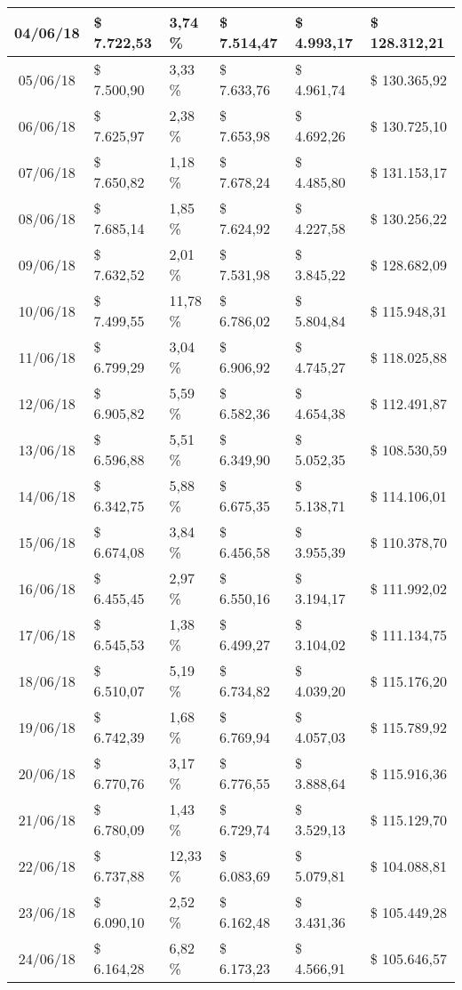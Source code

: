 \begin{small}
\begin{longtable}{|c|l|l|l|l|l|}
04/06/18 & \$ 7.722,53 & 3,74 \% & \$ 7.514,47 & \$ 4.993,17 & \$ 128.312,21 \\ \hline
05/06/18 & \$ 7.500,90 & 3,33 \% & \$ 7.633,76 & \$ 4.961,74 & \$ 130.365,92 \\ \hline
06/06/18 & \$ 7.625,97 & 2,38 \% & \$ 7.653,98 & \$ 4.692,26 & \$ 130.725,10 \\ \hline
07/06/18 & \$ 7.650,82 & 1,18 \% & \$ 7.678,24 & \$ 4.485,80 & \$ 131.153,17 \\ \hline
08/06/18 & \$ 7.685,14 & 1,85 \% & \$ 7.624,92 & \$ 4.227,58 & \$ 130.256,22 \\ \hline
09/06/18 & \$ 7.632,52 & 2,01 \% & \$ 7.531,98 & \$ 3.845,22 & \$ 128.682,09 \\ \hline
10/06/18 & \$ 7.499,55 & 11,78 \% & \$ 6.786,02 & \$ 5.804,84 & \$ 115.948,31 \\ \hline
11/06/18 & \$ 6.799,29 & 3,04 \% & \$ 6.906,92 & \$ 4.745,27 & \$ 118.025,88 \\ \hline
12/06/18 & \$ 6.905,82 & 5,59 \% & \$ 6.582,36 & \$ 4.654,38 & \$ 112.491,87 \\ \hline
13/06/18 & \$ 6.596,88 & 5,51 \% & \$ 6.349,90 & \$ 5.052,35 & \$ 108.530,59 \\ \hline
14/06/18 & \$ 6.342,75 & 5,88 \% & \$ 6.675,35 & \$ 5.138,71 & \$ 114.106,01 \\ \hline
15/06/18 & \$ 6.674,08 & 3,84 \% & \$ 6.456,58 & \$ 3.955,39 & \$ 110.378,70 \\ \hline
16/06/18 & \$ 6.455,45 & 2,97 \% & \$ 6.550,16 & \$ 3.194,17 & \$ 111.992,02 \\ \hline
17/06/18 & \$ 6.545,53 & 1,38 \% & \$ 6.499,27 & \$ 3.104,02 & \$ 111.134,75 \\ \hline
18/06/18 & \$ 6.510,07 & 5,19 \% & \$ 6.734,82 & \$ 4.039,20 & \$ 115.176,20 \\ \hline
19/06/18 & \$ 6.742,39 & 1,68 \% & \$ 6.769,94 & \$ 4.057,03 & \$ 115.789,92 \\ \hline
20/06/18 & \$ 6.770,76 & 3,17 \% & \$ 6.776,55 & \$ 3.888,64 & \$ 115.916,36 \\ \hline
21/06/18 & \$ 6.780,09 & 1,43 \% & \$ 6.729,74 & \$ 3.529,13 & \$ 115.129,70 \\ \hline
22/06/18 & \$ 6.737,88 & 12,33 \% & \$ 6.083,69 & \$ 5.079,81 & \$ 104.088,81 \\ \hline
23/06/18 & \$ 6.090,10 & 2,52 \% & \$ 6.162,48 & \$ 3.431,36 & \$ 105.449,28 \\ \hline
24/06/18 & \$ 6.164,28 & 6,82 \% & \$ 6.173,23 & \$ 4.566,91 & \$ 105.646,57 \\ \hline

\end{longtable}
\end{small}
